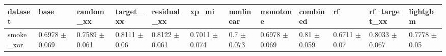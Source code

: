 \begin{tabular}{llllllllllll}
\toprule
dataset & base & random\_xx & target\_xx & residual\_xx & xp\_mi & nonlinear & monotone & combined & rf & rf\_target\_xx & lightgbm \\
\midrule
smoke\_xor & 0.6978 $\pm$ 0.069 & 0.7589 $\pm$ 0.061 & 0.8111 $\pm$ 0.06 & 0.8122 $\pm$ 0.061 & 0.7011 $\pm$ 0.074 & 0.7 $\pm$ 0.073 & 0.6978 $\pm$ 0.069 & 0.81 $\pm$ 0.059 & 0.6711 $\pm$ 0.07 & 0.8033 $\pm$ 0.067 & 0.7778 $\pm$ 0.05 \\
\bottomrule
\end{tabular}
